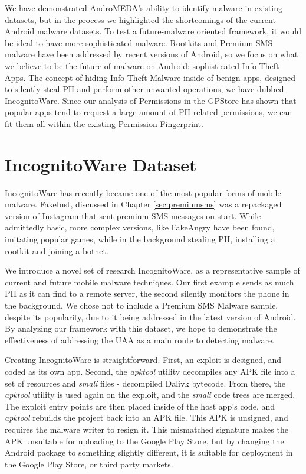We have demonstrated AndroMEDA's ability to identify malware in existing datasets, but in the process we highlighted the shortcomings of the current Android malware datasets. To test a future-malware oriented framework, it would be ideal to have more sophisticated malware. Rootkits and Premium SMS malware have been addressed by recent versions of Android, so we focus on what we believe to be the future of malware on Android: sophisticated Info Theft Apps. The concept of hiding Info Theft Malware inside of benign apps, designed to silently steal PII and perform other unwanted operations, we have dubbed IncognitoWare. Since our analysis of Permissions in the GPStore has shown that popular apps tend to request a large amount of PII-related permissions, we can fit them all within the existing Permission Fingerprint. 

\section{IncognitoWare Dataset}
\label{sec:incognitoware}
IncognitoWare has recently became one of the most popular forms of mobile malware\citep{nq2013}. FakeInst, discussed in Chapter \ref{sec:premiumsms} was a repackaged version of Instagram\citep{instagramandroid} that sent premium SMS messages on start. While admittedly basic, more complex versions, like FakeAngry\citep{fakeangry} have been found, imitating popular games, while in the background stealing PII, installing a rootkit and joining a botnet.

We introduce a novel set of research IncognitoWare, as a representative sample of current and future mobile malware techniques. Our first example sends as much PII as it can find to a remote server, the second silently monitors the phone in the background. We chose not to include a Premium SMS Malware sample, despite its popularity\citep{nq2013}, due to it being addressed in the latest version of Android. By analyzing our framework with this dataset, we hope to demonstrate the effectiveness of addressing the UAA as a main route to detecting malware.

Creating IncognitoWare is straightforward. First, an exploit is designed, and coded as its own app. Second, the \textit{apktool}\citep{apktool} utility decompiles any APK file into a set of resources and \textit{smali} files - decompiled Dalivk bytecode. From there, the \textit{apktool} utility is used again on the exploit, and the \textit{smali} code trees are merged. The exploit entry points are then placed inside of the host app's code, and \textit{apktool} rebuilds the project back into an APK file. This APK is unsigned, and requires the malware writer to resign it. This mismatched signature makes the APK unsuitable for uploading to the Google Play Store, but by changing the Android package to something slightly different, it is suitable for deployment in the Google Play Store, or third party markets.


